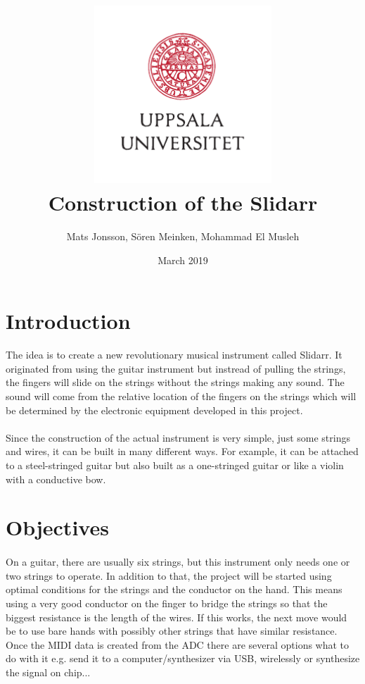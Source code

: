 \documentclass{article}
\title{\includegraphics[width=0.5\textwidth]{UU_logo.pdf}\\
Construction of the Slidarr}
\author{Mats Jonsson, Sören Meinken, Mohammad El Musleh}
\date{March 2019}
\begin{document}
\maketitle

\section{Introduction}
\paragraph{}The idea is to create a new revolutionary musical instrument called Slidarr. It originated from using the guitar instrument but instread of pulling the strings, the fingers will slide on the strings without the strings making any sound. The sound will come from the relative location of the fingers on the strings which will be determined by the electronic equipment developed in this project.

\paragraph{}Since the construction of the actual instrument is very simple, just some strings and wires, it can be built in many different ways. For example, it can be attached to a steel-stringed guitar but also built as a one-stringed guitar or like a violin with a conductive bow.

\section{Objectives}
\paragraph{}On a guitar, there are usually six strings, but this instrument only needs one or two strings to operate. In addition to that, the project will be started using optimal conditions for the strings and the conductor on the hand. This means using a very good conductor on the finger to bridge the strings so that the biggest resistance is the length of the wires. If this works, the next move would be to use bare hands with possibly other strings that have similar resistance. Once the MIDI data is created from the ADC there are several options what to do with it e.g. send it to a computer/synthesizer via USB, wirelessly or synthesize the signal on chip...
\end{document}
